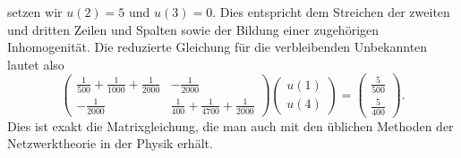 \documentclass[11pt,a4paper,leqno]{report}
\numberwithin{equation}{chapter}
\begin{document}
setzen wir $u(2)=5$ und $u(3)=0$. 
Dies entspricht dem Streichen der zweiten und dritten Zeilen und Spalten 
sowie der Bildung einer zugehörigen Inhomogenität. 
Die reduzierte Gleichung für die verbleibenden Unbekannten lautet also
\[
\begin{pmatrix}
	\frac{1}{500}+\frac{1}{1000}+\frac{1}{2000} & -\tfrac{1}{2000}\\[6pt]
	-\tfrac{1}{2000} & \tfrac{1}{400}+\tfrac{1}{4700}+\tfrac{1}{2000}
\end{pmatrix}
\begin{pmatrix}
	u(1)\\
	u(4)
\end{pmatrix}
=
\begin{pmatrix}
	\tfrac{5}{500}\\[4pt]
	\tfrac{5}{400}
\end{pmatrix}.
\]
Dies ist exakt die Matrixgleichung, die man auch 
mit den üblichen Methoden der Netzwerktheorie in der Physik erhält.
\end{document}
